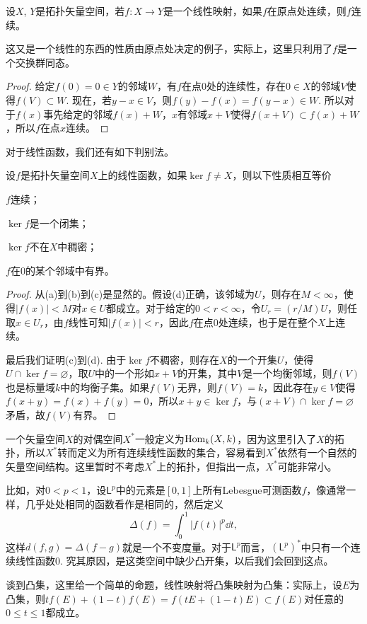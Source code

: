 \begin{pro}
	设$X$, $Y$是拓扑矢量空间，若$f:X\to Y$是一个线性映射，如果$f$在原点处连续，则$f$连续。
\end{pro}

这又是一个线性的东西的性质由原点处决定的例子，实际上，这里只利用了$f$是一个交换群同态。

\begin{proof}
	给定$f(0)=0\in Y$的邻域$W$，有$f$在点$0$处的连续性，存在$0\in X$的邻域$V$使得$f(V)\subset W$. 现在，若$y-x\in V$，则$f(y)-f(x)=f(y-x)\in W$. 所以对于$f(x)$事先给定的邻域$f(x)+W$，$x$有邻域$x+V$使得$f(x+V)\subset f(x)+W$，所以$f$在点$x$连续。
\end{proof}

对于线性函数，我们还有如下判别法。

\begin{pro}\label{cont}
设$f$是拓扑矢量空间$X$上的线性函数，如果$\ker f\neq X$，则以下性质相互等价
\begin{compactenum}[~~~(a)]
\item $f$连续；
\item $\ker f$是一个闭集；
\item $\ker f$不在$X$中稠密；
\item $f$在$0$的某个邻域中有界。
\end{compactenum}
\end{pro}

\begin{proof}
从(a)到(b)到(c)是显然的。假设(d)正确，该邻域为$U$，则存在$M< \infty$，使得$|f(x)|<M$对$x\in U$都成立。对于给定的$0<r<\infty$，令$U_r=(r/M)U$，则任取$x\in U_r$，由$f$线性可知$|f(x)|<r$，因此$f$在点$0$处连续，也于是在整个$X$上连续。

最后我们证明(c)到(d). 由于$\ker f$不稠密，则存在$X$的一个开集$U$，使得$U\cap \ker f=\varnothing$，取$U$中的一个形如$x+V$的开集，其中$V$是一个均衡邻域，则$f(V)$也是标量域$k$中的均衡子集。如果$f(V)$无界，则$f(V)=k$，因此存在$y\in V$使得$f(x+y)=f(x)+f(y)=0$，所以$x+y\in \ker f$，与$(x+V)\cap \ker f=\varnothing$矛盾，故$f(V)$有界。
\end{proof}

\begin{para}[对偶空间]
	一个矢量空间$X$的对偶空间$X^*$一般定义为$\operatorname{Hom}_k(X,k)$，因为这里引入了$X$的拓扑，所以$X^*$转而定义为所有连续线性函数的集合，容易看到$X^*$依然有一个自然的矢量空间结构。这里暂时不考虑$X^*$上的拓扑，但指出一点，$X^*$可能非常小。

	比如，对$0<p<1$，设$\mathsf{L}^p$中的元素是$[0,1]$上所有Lebesgue可测函数$f$，像通常一样，几乎处处相同的函数看作是相同的，然后定义
	\[
	\Delta(f)=\int_0^1 |f(t)|^p \dd t,
	\]
	这样$d(f,g)=\Delta(f-g)$就是一个不变度量。对于$\mathsf{L}^p$而言，$(\mathsf{L}^p)^*$中只有一个连续线性函数$0$. 究其原因，是这类空间中缺少凸开集，以后我们会回到这点。

	谈到凸集，这里给一个简单的命题，线性映射将凸集映射为凸集：实际上，设$E$为凸集，则$tf(E)+(1-t)f(E)=f(tE+(1-t)E)\subset f(E)$对任意的$0\leq t\leq 1$都成立。
\end{para}

